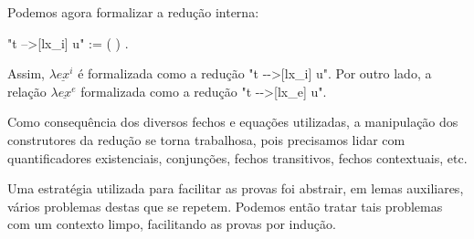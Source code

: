\bigskip


Podemos agora formalizar a redução interna:

\bigskip

\coqdocemptyline \coqdocnoindent {} "t -->[lx\_i] u" :=
(   ) .

\bigskip

Assim, $\lambda \underline{ex}^i$ é formalizada como a redução "t -{}->[lx\_i]
u". Por outro lado, a relação $\lambda \underline{ex}^e$ formalizada como a
redução "t -{}->[lx\_e] u".

\coqdocemptyline 


Como consequência dos diversos fechos e equações utilizadas, a manipulação dos
construtores da redução se torna trabalhosa, pois precisamos lidar com
quantificadores existenciais, conjunções, fechos transitivos, fechos
contextuais, etc.

Uma estratégia utilizada para facilitar as provas foi abstrair, em lemas
auxiliares, vários problemas destas que se repetem. Podemos então tratar tais
problemas com um contexto limpo, facilitando as provas por indução. 




